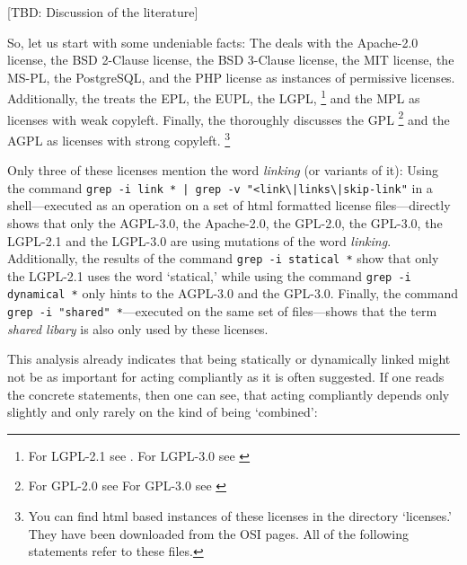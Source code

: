 [TBD: Discussion of the literature]

So, let us start with some undeniable facts: The \oslic{} deals with 
the Apache-2.0 license,\citeAPL{}
the BSD 2-Clause license,\citeBSDsimple{} 
the BSD 3-Clause license,\citeBSDnew{} 
the MIT license,\citeMIT{} 
the MS-PL,\citeMSPL{} 
the PostgreSQL,\citePGL{}
and the PHP license\citePHP{} 
as instances of permissive licenses.
Additionally, the \oslic{} treats 
the EPL,\citeEPL{} 
the EUPL,\citeEUPL{} 
the LGPL,
  \footnote{For LGPL-2.1 see \cite[cf.][\nopage wp]{Lgpl21OsiLicense1999a}. 
  For LGPL-3.0 see \cite [cf.][\nopage wp]{Lgpl30OsiLicense2007a} } 
and the MPL\citeMPL{}
as licenses with weak copyleft. Finally, the \oslic{} thoroughly discusses 
the GPL%
  \footnote{For GPL-2.0 see \cite [cf.][\nopage wp]{Gpl20OsiLicense1991a} 
  For GPL-3.0 see \cite [cf.][\nopage wp]{Gpl30OsiLicense2007a} } 
and the AGPL\citeAGPL{}
as licenses with strong copyleft.%
  \footnote{You can find html based instances of these licenses in the
    \oslic{} directory `licenses.' They have been downloaded from the
    OSI pages. All of the following statements refer to these files.}

Only three of these licenses mention the word \emph{linking} (or variants of
it): Using the command \texttt{grep -i link * | grep -v
"<link\textbackslash{}|links\textbackslash{}|skip-link"} in a shell---executed
as an operation on a set of html formatted license files---directly shows that
only the AGPL-3.0, the Apache-2.0, the GPL-2.0, the GPL-3.0, the LGPL-2.1 and
the LGPL-3.0 are using mutations of the word \emph{linking}. Additionally, the
results of the command \texttt{grep -i statical *} show that only the LGPL-2.1
uses the word `statical,' while using the command \texttt{grep -i dynamical *}
only hints to the AGPL-3.0 and the GPL-3.0. Finally, the command \texttt{grep -i
"shared" *}---executed on the same set of files---shows that the term
\emph{shared libary} is also only used by these licenses.

This analysis already indicates that being statically or dynamically linked
might not be as important for acting compliantly as it is often suggested.
% 
If one reads the concrete statements, then one can see, that acting compliantly
depends only slightly and only rarely on the kind of being `combined':

